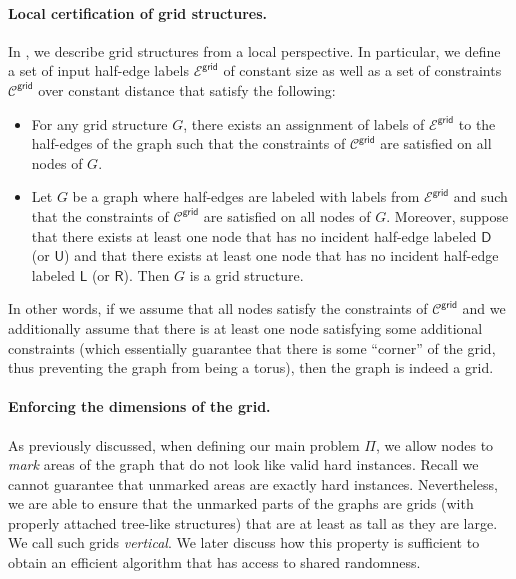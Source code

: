 \documentclass[11pt]{article}
\newcommand{\lleft}{\mathsf {L}}
\newcommand{\lright}{\mathsf {R}}
\newcommand{\lup}{\mathsf {U}}
\newcommand{\ldown}{\mathsf {D}}
\newcommand{\lgrid}{\mathsf {grid}}
\begin{document}
\paragraph{Local certification of grid structures.}
In , we describe grid structures from a local perspective.
In particular, we define a set of input half-edge labels $\mathcal{E}^{\lgrid}$
of constant size as well as a set of constraints $\mathcal{C}^{\lgrid}$ over constant
distance that satisfy the following:
\begin{itemize}
	\item For any grid structure $G$, there exists an assignment of labels of $\mathcal{E}^{\lgrid}$ to the half-edges of the graph such that the constraints of $\mathcal{C}^{\lgrid}$ are satisfied on all nodes of $G$.
	\item Let $G$ be a graph where half-edges are labeled with labels from
	$\mathcal{E}^{\lgrid}$ and such that the constraints of $\mathcal{C}^{\lgrid}$
	are satisfied on all nodes of $G$. 
	Moreover, suppose that there exists at least one node that has no incident half-edge labeled $\ldown$ (or $\lup$) and that there exists at least one node that has no incident half-edge labeled $\lleft$ (or $\lright$).
	Then $G$ is a grid structure.
\end{itemize}
In other words, if we assume that all nodes satisfy the constraints of $\mathcal{C}^{\lgrid}$ and we additionally assume that there is at least one node satisfying some additional constraints (which essentially guarantee that there is some ``corner'' of the grid, thus preventing the graph from being a torus), then the graph is indeed a grid.

\paragraph{Enforcing the dimensions of the grid.}
As previously discussed, when defining our main problem $\Pi$, we allow nodes to
\emph{mark} areas of the graph that do not look like valid hard instances.
Recall we cannot guarantee that unmarked areas are exactly hard instances.
Nevertheless, we are able to ensure that the unmarked parts of the graphs are
grids (with properly attached tree-like structures) that are at least as tall as
they are large. We call such grids \emph{vertical}. We later discuss how this
property is sufficient to obtain an efficient algorithm that has access to
shared randomness.
\end{document}
